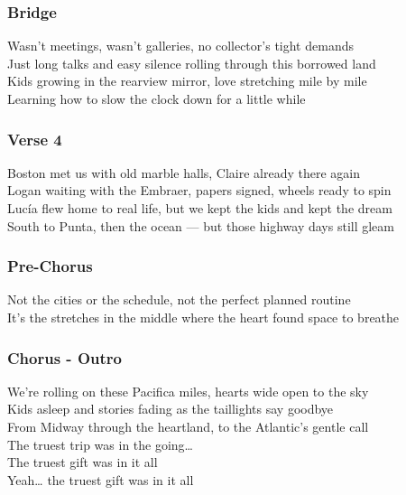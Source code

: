 \subsubsection{Bridge}\label{bridge-24}

Wasn't meetings, wasn't galleries, no collector's tight demands\\
Just long talks and easy silence rolling through this borrowed land\\
Kids growing in the rearview mirror, love stretching mile by mile\\
Learning how to slow the clock down for a little while

\subsubsection{Verse 4}\label{verse-4-5}

Boston met us with old marble halls, Claire already there again\\
Logan waiting with the Embraer, papers signed, wheels ready to spin\\
Lucía flew home to real life, but we kept the kids and kept the dream\\
South to Punta, then the ocean --- but those highway days still gleam

\subsubsection{Pre-Chorus}\label{pre-chorus-43}

Not the cities or the schedule, not the perfect planned routine\\
It's the stretches in the middle where the heart found space to breathe

\subsubsection{Chorus - Outro}\label{chorus---outro}

We're rolling on these Pacifica miles, hearts wide open to the sky\\
Kids asleep and stories fading as the taillights say goodbye\\
From Midway through the heartland, to the Atlantic's gentle call\\
The truest trip was in the going\ldots{}\\
The truest gift was in it all\\
Yeah\ldots{} the truest gift was in it all

